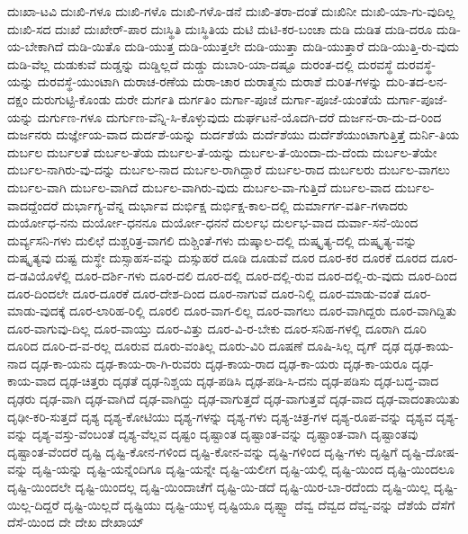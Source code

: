 {ದುಃಖಾ-ಟವಿ
ದುಃಖಿ-ಗಳೂ
ದುಃಖಿ-ಗಳೊ
ದುಃಖಿ-ಗಳೊ-ಡನೆ
ದುಃಖಿ-ತರಾ-ದಂತೆ
ದುಃಖಿನೀ
ದುಃಖಿ-ಯಾ-ಗು-ವುದಿಲ್ಲ
ದುಃಖಿ-ಸದ
ದುಃಖೆ
ದುಃಖೇರ್-ಪಾರ
ದುಃಸ್ಥಿತಿ
ದುಃಸ್ಥಿತಿಯ
ದುಟಿ
ದುಟಿ-ಕರ-ಬಂಚಾ
ದುಡಿ
ದುಡಿತ
ದುಡಿ-ದರೂ
ದುಡಿ-ಯ-ಬೇಕಾಗಿದೆ
ದುಡಿ-ಯಿತೊ
ದುಡಿ-ಯುತ್ತ
ದುಡಿ-ಯುತ್ತಲೇ
ದುಡಿ-ಯುತ್ತಾ
ದುಡಿ-ಯುತ್ತಾರೆ
ದುಡಿ-ಯುತ್ತಿ-ರು-ವುದು
ದುಡಿ-ವೆಲ್ಲ
ದುಡುಕುವೆ
ದುಡ್ಡನ್ನು
ದುಡ್ಡಿಲ್ಲದೆ
ದುಡ್ಡು
ದುಬಾರಿ-ಯಾ-ದಷ್ಟೂ
ದುರಂತ-ದಲ್ಲಿ
ದುರವಸ್ಥೆ
ದುರವಸ್ಥೆ-ಯನ್ನು
ದುರವಸ್ಥೆ-ಯುಂಟಾಗಿ
ದುರಾಚ-ರಣೆಯ
ದುರಾ-ಚಾರ
ದುರಾತ್ಮನು
ದುರಾಶೆ
ದುರಿತ-ಗಳನ್ನು
ದುರಿ-ತದ-ಲನ-ದಕ್ಷಂ
ದುರುಗುಟ್ಟಿ-ಕೊಂಡು
ದುರೇ
ದುರ್ಗತಿ
ದುರ್ಗತಿಂ
ದುರ್ಗಾ-ಪೂಜೆ
ದುರ್ಗಾ-ಪೂಜೆ-ಯಂತೆಯೆ
ದುರ್ಗಾ-ಪೂಜೆ-ಯನ್ನು
ದುರ್ಗುಣ-ಗಳೂ
ದುರ್ಗುಣ-ವೆನ್ನಿ-ಸಿ-ಕೊಳ್ಳುವುದು
ದುರ್ಘಟನೆ-ಯೊದಗಿ-ದರೆ
ದುರ್ಜನ-ರಾ-ದು-ದ-ರಿಂದ
ದುರ್ಜನರು
ದುರ್ಜ್ಞೇಯ-ವಾದ
ದುರ್ದಶೆ-ಯನ್ನು
ದುರ್ದಶೆಯೆ
ದುರ್ದೆಶೆಯು
ದುರ್ದೆಶೆಯುಂಟಾಗುತ್ತಿತ್ತೆ
ದುರ್ನಿ-ತಿಯ
ದುರ್ಬಲ
ದುರ್ಬಲತೆ
ದುರ್ಬಲ-ತೆಯ
ದುರ್ಬಲ-ತೆ-ಯನ್ನು
ದುರ್ಬಲ-ತೆ-ಯಿಂದಾ-ದು-ದೆಂದು
ದುರ್ಬಲ-ತೆಯೇ
ದುರ್ಬಲ-ನಾಗಿರು-ವು-ದನ್ನು
ದುರ್ಬಲ-ನಾದ
ದುರ್ಬಲ-ರಾಗಿದ್ದಾರೆ
ದುರ್ಬಲ-ರಾದ
ದುರ್ಬಲರು
ದುರ್ಬಲ-ವಾಗಲು
ದುರ್ಬಲ-ವಾಗಿ
ದುರ್ಬಲ-ವಾಗಿದೆ
ದುರ್ಬಲ-ವಾಗಿರು-ವುದು
ದುರ್ಬಲ-ವಾ-ಗುತ್ತಿದೆ
ದುರ್ಬಲ-ವಾದ
ದುರ್ಬಲ-ವಾದದ್ದೆಂದರೆ
ದುರ್ಭಾಗ್ಯ-ವೆನ್ನ
ದುರ್ಭಾವ
ದುರ್ಭಿಕ್ಷ
ದುರ್ಭಿಕ್ಷ-ಕಾಲ-ದಲ್ಲಿ
ದುರ್ಮಾರ್ಗ-ವರ್ತಿ-ಗಳಾದರು
ದುರ್ಯೋಧ-ನನು
ದುರ್ಯೋ-ಧನನೂ
ದುರ್ಯೋ-ಧನನೆ
ದುರ್ಲಭ
ದುರ್ಲಭ-ವಾದ
ದುರ್ವಾ-ಸನೆ-ಯಿಂದ
ದುರ್ವ್ಯಸನಿ-ಗಳು
ದುಲಿಛೆ
ದುಶ್ಚರಿತ್ರ-ವಾಗಲಿ
ದುಶ್ಚಿಂತೆ-ಗಳು
ದುಷ್ಕಾಲ-ದಲ್ಲಿ
ದುಷ್ಕೃತ್ಯ-ದಲ್ಲಿ
ದುಷ್ಕೃತ್ಯ-ವನ್ನು
ದುಷ್ಕೃತ್ಯವು
ದುಷ್ಟ
ದುಸ್ಥೇ
ದುಸ್ಸಾಹಸ-ವನ್ನು
ದುಸ್ಸುಹರೆ
ದೂಡಿ
ದೂಡುವೆ
ದೂರ
ದೂರ-ಕರ
ದೂರಕೆ
ದೂರದ
ದೂರ-ದ-ಡವಿಯೊಳೆಲ್ಲಿ
ದೂರ-ದರ್ಶಿ-ಗಳು
ದೂರ-ದಲಿ
ದೂರ-ದಲ್ಲಿ
ದೂರ-ದಲ್ಲಿ-ರುವ
ದೂರ-ದಲ್ಲಿ-ರು-ವುದು
ದೂರ-ದಿಂದ
ದೂರ-ದಿಂದಲೇ
ದೂರ-ದೂರಕೆ
ದೂರ-ದೇಶ-ದಿಂದ
ದೂರ-ನಾಗುವೆ
ದೂರ-ನಿಲ್ಲಿ
ದೂರ-ಮಾಡು-ವಂತೆ
ದೂರ-ಮಾಡು-ವುದಕ್ಕೆ
ದೂರ-ಲಾರಿಹ-ರಿಲ್ಲಿ
ದೂರಲಿ
ದೂರ-ವಾಗ-ಲಿಲ್ಲ
ದೂರ-ವಾಗಲು
ದೂರ-ವಾಗಿದ್ದರು
ದೂರ-ವಾಗಿದ್ದಿತು
ದೂರ-ವಾಗುವು-ದಿಲ್ಲ
ದೂರ-ವಾಯ್ತು
ದೂರ-ವಿತ್ತು
ದೂರ-ವಿ-ರ-ಬೇಕು
ದೂರ-ಸನಿಹ-ಗಳಲ್ಲಿ
ದೂರಾಗಿ
ದೂರಿ
ದೂರಿದ
ದೂರಿ-ದ-ವ-ರಲ್ಲ
ದೂರುವ
ದೂರು-ವಂತಿಲ್ಲ
ದೂರು-ವಿರಿ
ದೂಷಣೆ
ದೂಷಿ-ಸಿಲ್ಲ
ದೃಗ್
ದೃಢ
ದೃಢ-ಕಾಯ-ನಾದ
ದೃಢ-ಕಾ-ಯನು
ದೃಢ-ಕಾಯ-ರಾ-ಗಿ-ರುವರು
ದೃಢ-ಕಾಯ-ರಾದ
ದೃಢ-ಕಾ-ಯರು
ದೃಢ-ಕಾ-ಯರೂ
ದೃಢ-ಕಾಯ-ವಾದ
ದೃಢ-ಚಿತ್ತರು
ದೃಢತೆ
ದೃಢ-ನಿಶ್ಚಯ
ದೃಢ-ಪಡಿಸಿ
ದೃಢ-ಪಡಿ-ಸಿ-ದನು
ದೃಢ-ಪಡಿಸು
ದೃಢ-ಬದ್ಧ-ವಾದ
ದೃಢರು
ದೃಢ-ವಾಗಿ
ದೃಢ-ವಾಗಿದೆ
ದೃಢ-ವಾಗಿದ್ದು
ದೃಢ-ವಾಗುತ್ತದೆ
ದೃಢ-ವಾಗುತ್ತವೆ
ದೃಢ-ವಾದ
ದೃಢ-ವಾದಂತಾಯಿತು
ದೃಢೀ-ಕರಿ-ಸುತ್ತದೆ
ದೃಶ್ಯ
ದೃಶ್ಯ-ಕೋಟಿಯು
ದೃಶ್ಯ-ಗಳನ್ನು
ದೃಶ್ಯ-ಗಳು
ದೃಶ್ಯ-ಚಿತ್ರ-ಗಳ
ದೃಶ್ಯ-ರೂಪ-ವನ್ನು
ದೃಶ್ಯವ
ದೃಶ್ಯ-ವನ್ನು
ದೃಶ್ಯ-ವಸ್ತು-ವೆಂಬಂತೆ
ದೃಶ್ಯ-ವೆಲ್ಲವ
ದೃಷ್ಟಂ
ದೃಷ್ಟಾಂತ
ದೃಷ್ಟಾಂತ-ವನ್ನು
ದೃಷ್ಟಾಂತ-ವಾಗಿ
ದೃಷ್ಟಾಂತವು
ದೃಷ್ಟಾಂತ-ವೆಂದರೆ
ದೃಷ್ಟಿ
ದೃಷ್ಟಿ-ಕೋನ-ಗಳಿಂದ
ದೃಷ್ಟಿ-ಕೋನ-ವನ್ನು
ದೃಷ್ಟಿ-ಗಳಿಂದ
ದೃಷ್ಟಿ-ಗಳು
ದೃಷ್ಟಿಗೆ
ದೃಷ್ಟಿ-ದೋಷ-ವನ್ನು
ದೃಷ್ಟಿ-ಯನ್ನು
ದೃಷ್ಟಿ-ಯನ್ನೆಂದಿಗೂ
ದೃಷ್ಟಿ-ಯನ್ನೇ
ದೃಷ್ಟಿ-ಯಲೀಗ
ದೃಷ್ಟಿ-ಯಲ್ಲಿ
ದೃಷ್ಟಿ-ಯಿಂದ
ದೃಷ್ಟಿ-ಯಿಂದಲೂ
ದೃಷ್ಟಿ-ಯಿಂದಲೇ
ದೃಷ್ಟಿ-ಯಿಂದಲ್ಲ
ದೃಷ್ಟಿ-ಯಿಂದಾಚೆಗೆ
ದೃಷ್ಟಿ-ಯಿ-ಡದೆ
ದೃಷ್ಟಿ-ಯಿರ-ಬಾ-ರದೆಂದು
ದೃಷ್ಟಿ-ಯಿಲ್ಲ
ದೃಷ್ಟಿ-ಯಿಲ್ಲ-ದಿದ್ದರೆ
ದೃಷ್ಟಿ-ಯಿಲ್ಲದೆ
ದೃಷ್ಟಿಯು
ದೃಷ್ಟಿ-ಯುಳ್ಳ
ದೃಷ್ಟಿಯೂ
ದೃಷ್ಟ್ವಾ
ದೆವ್ವ
ದೆವ್ವದ
ದೆವ್ವ-ವನ್ನು
ದೆಶೆಯೆ
ದೆಸೆಗೆ
ದೆಸೆ-ಯಿಂದ
ದೇ
ದೇಖ
ದೇಖಾಯ್
}
